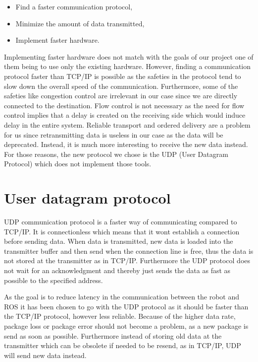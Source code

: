 \begin{itemize}
	\item Find a faster communication protocol,
	\item Minimize the amount of data transmitted,
	\item Implement faster hardware.	
\end{itemize}

Implementing faster hardware does not match with the goals of our project one of them being to use only the existing hardware. 
However, finding a communication protocol faster than TCP/IP is possible as the safeties in the protocol tend to slow down the overall speed of the communication. Furthermore, some of the safeties like congestion control are irrelevant in our case since we are directly connected to the destination. Flow control is not necessary as the need for flow control implies that a delay is created on the receiving side which would induce delay in the entire system. Reliable transport and ordered delivery are a problem for us since retransmitting data is useless in our case as the data will be deprecated. Instead, it is much more interesting to receive the new data instead. For those reasons, the new protocol we chose is the UDP (User Datagram Protocol) which does not implement those tools.

\section*{User datagram protocol}
UDP communication protocol is a faster way of communicating compared to TCP/IP. It is connectionless which means that it wont establish a connection before sending data. When data is transmitted, new data is loaded into the transmitter buffer and then send when the connection line is free, thus the data is not stored at the transmitter as in TCP/IP. Furthermore the UDP protocol does not wait for an acknowledgment and thereby just sends the data as fast as possible to the specified address.

As the goal is to reduce latency in the communication between the robot and ROS it has been chosen to go with the UDP protocol as it should be faster than the TCP/IP protocol, however less reliable. Because of the higher data rate, package loss or package error should not become a problem, as a new package is send as soon as possible. Furthermore instead of storing old data at the transmitter which can be obsolete if needed to be resend, as in TCP/IP, UDP will send new data instead.

